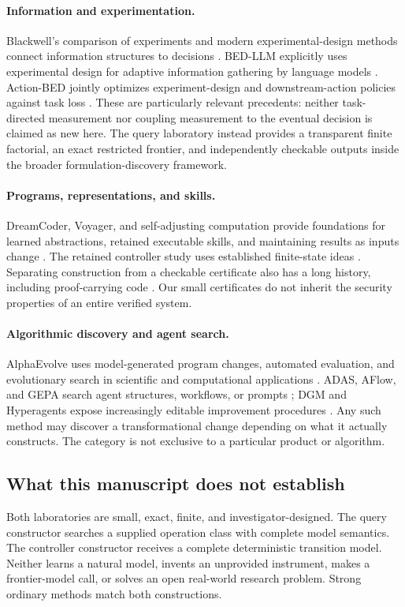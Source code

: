 \documentclass[11pt,letterpaper]{article}
\theoremstyle{remark}\newtheorem{remark}{Remark}[section]
\begin{document}
\paragraph{Information and experimentation.}
Blackwell's comparison of experiments and modern experimental-design methods connect information structures to decisions \citep{blackwell1953,rainforth2023}. BED-LLM explicitly uses experimental design for adaptive information gathering by language models \citep{choudhury2025}. Action-BED jointly optimizes experiment-design and downstream-action policies against task loss \citep{rossa2026}. These are particularly relevant precedents: neither task-directed measurement nor coupling measurement to the eventual decision is claimed as new here. The query laboratory instead provides a transparent finite factorial, an exact restricted frontier, and independently checkable outputs inside the broader formulation-discovery framework.

\paragraph{Programs, representations, and skills.}
DreamCoder, Voyager, and self-adjusting computation provide foundations for learned abstractions, retained executable skills, and maintaining results as inputs change \citep{ellis2020,wang2023,acar2011}. The retained controller study uses established finite-state ideas \citep{hopcroft1971,dean1997}. Separating construction from a checkable certificate also has a long history, including proof-carrying code \citep{necula1997}. Our small certificates do not inherit the security properties of an entire verified system.

\paragraph{Algorithmic discovery and agent search.}
AlphaEvolve uses model-generated program changes, automated evaluation, and evolutionary search in scientific and computational applications \citep{novikov2025}. ADAS, AFlow, and GEPA search agent structures, workflows, or prompts \citep{hu2024,zhang2024aflow,agrawal2025}; DGM and Hyperagents expose increasingly editable improvement procedures \citep{zhang2025dgm,zhang2026hyper}. Any such method may discover a transformational change depending on what it actually constructs. The category is not exclusive to a particular product or algorithm.

\subsection{What this manuscript does not establish}
Both laboratories are small, exact, finite, and investigator-designed. The query constructor searches a supplied operation class with complete model semantics. The controller constructor receives a complete deterministic transition model. Neither learns a natural model, invents an unprovided instrument, makes a frontier-model call, or solves an open real-world research problem. Strong ordinary methods match both constructions.
\end{document}
